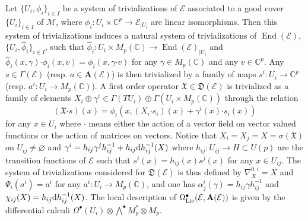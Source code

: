 \documentclass[number]{elsarticle}
\theoremstyle{definition}
\theoremstyle{remark}
\numberwithin{equation}{section}
\begin{document}
Let $\{ U_i, \phi_i \}_{i \in I}$ be a system of trivializations of ${{{{\mathcal{{E}}}}}}$ associated to a good cover $\{ U_i \}_{i \in I}$ of ${{{{\mathcal{{M}}}}}}$, where $\phi_i : U_i \times {{\mathbb C}}^p \rightarrow {{{{\mathcal{{E}}}}}}_{|U_i}$ are linear isomorphisms. Then this system of trivializations induces a natural system of trivializations of $\operatorname{End}({{{{\mathcal{{E}}}}}})$, $\{ U_i, {\widehat{\phi}}_i \}_{i \in I}$, such that ${\widehat{\phi}}_i : U_i \times M_p({{\mathbb C}}) \rightarrow \operatorname{End}({{{{\mathcal{{E}}}}}})_{|U_i}$ and ${\widehat{\phi}}_i(x,\gamma) {\mathord{\cdot}} \phi_i(x,v) = \phi_i(x, \gamma {\mathord{\cdot}} v)$ for any $\gamma \in M_p({{\mathbb C}})$ and any $v \in {{\mathbb C}}^p$. Any $s \in \Gamma({{{{\mathcal{{E}}}}}})$ (resp. $a \in {{{{\mathbf{{A}}}}}}({{{{\mathcal{{E}}}}}})$) is then trivialized by a family of maps $s^i : U_i \rightarrow {{\mathbb C}}^p$ (resp. $a^i : U_i \rightarrow M_p({{\mathbb C}})$). A first order operator ${{\mathfrak X}} \in {{\mathfrak D}}({{{{\mathcal{{E}}}}}})$ is trivialized as a family of elements $X_i \oplus \gamma^i \in \Gamma(T U_i) \oplus \Gamma(U_i \times M_p({{\mathbb C}}))$ through the relation
\begin{equation*}
({{\mathfrak X}} {\mathord{\cdot}} s)(x) = \phi_i \left(x, (X_i {\mathord{\cdot}} s_i)(x) + \gamma^i(x) {\mathord{\cdot}} s_i(x) \right)
\end{equation*}
for any $x \in U_i$ where ${\mathord{\cdot}}$ means either the action of a vector field on vector valued functions or the action of matrices on vectors. Notice that $X_i = X_j = X = \sigma({{\mathfrak X}})$ on $U_{ij} \neq {{\varnothing}}$ and $\gamma^i = h_{ij} \gamma^j h_{ij}^{-1} + h_{ij} {\text{\textup{d}}} h_{ij}^{-1} (X)$ where $h_{ij} : U_{ij} \rightarrow H \subset U(p)$ are the transition functions of ${{{{\mathcal{{E}}}}}}$ such that $s^i(x) = h_{ij}(x) s^j(x)$ for any $x \in U_{ij}$.
The system of trivializations considered for ${{\mathfrak D}}({{{{\mathcal{{E}}}}}})$ is thus defined by $\nabla^{0,i}_X = X$ and $\Psi_i(a^i) = a^i$ for any $a^i : U_i \rightarrow M_p({{\mathbb C}})$, and one has $\alpha_j^i(\gamma) = h_{ij} \gamma h_{ij}^{-1}$ and $\chi_{ij}(X) = h_{ij} {\text{\textup{d}}} h_{ij}^{-1}(X)$. The local description of $\Omega^{\bullet}_{{\text{\textup{Lie}}}}({{{{\mathcal{{E}}}}}}, {{{{\mathbf{{A}}}}}}({{{{\mathcal{{E}}}}}}))$ is given by the differential calculi $\Omega^{\bullet}(U_i) \otimes {{\textstyle\bigwedge}}^{\bullet} M_p^\ast \otimes M_p$.
\end{document}

